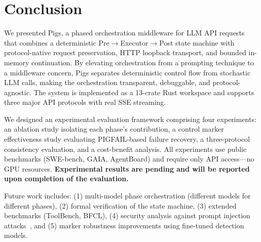 \section{Conclusion}
\label{sec:conclusion}

We presented Pigs, a phased orchestration middleware for LLM API requests that combines a deterministic Pre$\rightarrow$Executor$\rightarrow$Post state machine with protocol-native request preservation, HTTP loopback transport, and bounded in-memory continuation. By elevating orchestration from a prompting technique to a middleware concern, Pigs separates deterministic control flow from stochastic LLM calls, making the orchestration transparent, debuggable, and protocol-agnostic. The system is implemented as a 13-crate Rust workspace and supports three major API protocols with real SSE streaming.

We designed an experimental evaluation framework comprising four experiments: an ablation study isolating each phase's contribution, a control marker effectiveness study evaluating PIGFAIL-based failure recovery, a three-protocol consistency evaluation, and a cost-benefit analysis. All experiments use public benchmarks (SWE-bench, GAIA, AgentBoard) and require only API access---no GPU resources. \textbf{Experimental results are pending and will be reported upon completion of the evaluation.}

Future work includes: (1) multi-model phase orchestration (different models for different phases), (2) formal verification of the state machine, (3) extended benchmarks (ToolBench, BFCL), (4) security analysis against prompt injection attacks~\citep{greshake2023promptinjection}, and (5) marker robustness improvements using fine-tuned detection models.
